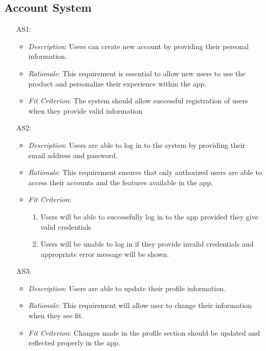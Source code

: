 \documentclass[12pt]{article}
\begin{document}
\subsection{Account System}
\noindent \begin{itemize}
    \item[AS1:] 
    \begin{itemize}
        \item \textit{Description}: Users can create new account by providing their personal information.
        \item \textit{Rationale}: This requirement is essential to allow new users to use the product and personalize their experience within the app.
        \item \textit{Fit Criterion}: The system should allow successful registration of users when they provide valid information
    \end{itemize}
    \item[AS2:] 
    \begin{itemize}
        \item \textit{Description}: Users are able to log in to the system by providing their email address and password.
        \item \textit{Rationale}: This requirement ensures that only authorized users are able to access their accounts and the features available in the app.
        \item \textit{Fit Criterion}: 
        \begin{enumerate}
            \item Users will be able to successfully log in to the app provided they give valid credentials
            \item Users will be unable to log in if they provide invalid credentials and appropriate error message will be shown.
        \end{enumerate}
    \end{itemize}
    \item[AS3:] 
    \begin{itemize}
        \item \textit{Description}: Users are able to update their profile information.
        \item \textit{Rationale}: This requirement will allow user to change their information when they see fit.
        \item \textit{Fit Criterion}: Changes made in the profile section should be updated and reflected properly in the app.
    \end{itemize}

\end{itemize}
\end{document}
